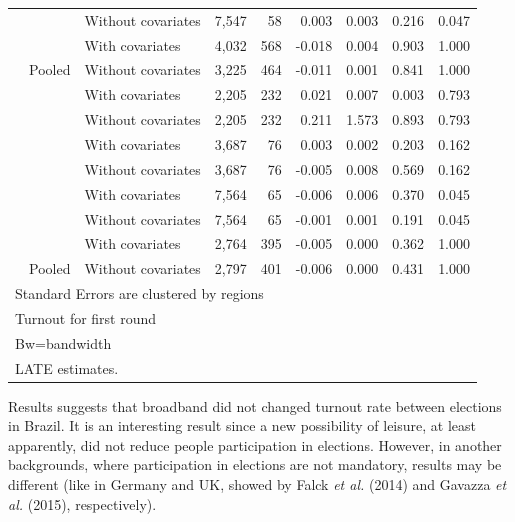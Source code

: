 \documentclass[
  12pt,
]{article}
\begin{document}
\begin{table}[H]
\begin{tabular}[t]{lllrrrrrr}
 & \multirow{-2}{*}{\raggedright\arraybackslash 60000} & Without covariates & 7,547 & 58 & 0.003 & 0.003 & 0.216 & 0.047\\


 &  & With covariates & 4,032 & 568 & -0.018 & 0.004 & 0.903 & 1.000\\


\multirow{-8}{*}{\raggedright\arraybackslash 2010} & Pooled & Without covariates & 3,225 & 464 & -0.011 & 0.001 & 0.841 & 1.000\\
\cmidrule{1-9}
 &  & With covariates & 2,205 & 232 & 0.021 & 0.007 & 0.003 & 0.793\\


 & \multirow{-2}{*}{\raggedright\arraybackslash 20000} & Without covariates & 2,205 & 232 & 0.211 & 1.573 & 0.893 & 0.793\\


 &  & With covariates & 3,687 & 76 & 0.003 & 0.002 & 0.203 & 0.162\\


 & \multirow{-2}{*}{\raggedright\arraybackslash 40000} & Without covariates & 3,687 & 76 & -0.005 & 0.008 & 0.569 & 0.162\\


 &  & With covariates & 7,564 & 65 & -0.006 & 0.006 & 0.370 & 0.045\\


 & \multirow{-2}{*}{\raggedright\arraybackslash 60000} & Without covariates & 7,564 & 65 & -0.001 & 0.001 & 0.191 & 0.045\\


 &  & With covariates & 2,764 & 395 & -0.005 & 0.000 & 0.362 & 1.000\\


\multirow{-8}{*}{\raggedright\arraybackslash 2012} & Pooled & Without covariates & 2,797 & 401 & -0.006 & 0.000 & 0.431 & 1.000\\
\bottomrule
\multicolumn{9}{l}{Standard Errors are clustered by regions}\\
\multicolumn{9}{l}{Turnout for first round}\\
\multicolumn{9}{l}{Bw=bandwidth}\\
\multicolumn{9}{l}{LATE estimates.}\\
\end{tabular}
\end{table}

Results suggests that broadband did not changed turnout rate between
elections in Brazil. It is an interesting result since a new possibility
of leisure, at least apparently, did not reduce people participation in
elections. However, in another backgrounds, where participation in
elections are not mandatory, results may be different (like in Germany
and UK, showed by Falck \emph{et al.} (2014) and Gavazza \emph{et al.}
(2015), respectively).
\end{document}
